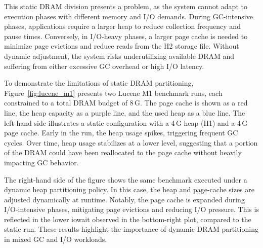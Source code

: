 This static DRAM division presents a problem, as the system cannot adapt to 
execution phases with different memory and I/O demands. During GC-intensive phases,
applications require a larger heap to reduce collection frequency and pause times. 
Conversely, in I/O-heavy phases, a larger page cache is needed to minimize page evictions
and reduce reads from the H2 storage file. Without dynamic adjustment, the system 
risks underutilizing available DRAM and suffering from either excessive GC overhead or high I/O latency.

To demonstrate the limitations of static DRAM partitioning, Figure~\ref{fig:lucene_m1} presents two Lucene 
M1 benchmark runs, each constrained to a total DRAM budget of 8\,G. The page cache is shown as a red line, 
the heap capacity as a purple line, and the used heap as a blue line. The left-hand side illustrates a static
configuration with a 4\,G heap (H1) and a 4\,G page cache. Early in the run, the heap usage spikes, triggering 
frequent GC cycles. Over time, heap usage stabilizes at a lower level, suggesting that a portion of the DRAM could 
have been reallocated to the page cache without heavily impacting GC behavior.

The right-hand side of the figure shows the same benchmark executed under a dynamic heap partitioning policy. In this case, 
the heap and page-cache sizes are adjusted dynamically at runtime. Notably, the page cache is expanded 
during I/O-intensive phases, mitigating page evictions and reducing I/O pressure. This is reflected in the 
lower iowait observed in the bottom-right plot, compared to the static run. 
These results highlight the importance of dynamic DRAM partitioning in mixed GC and I/O workloads.

